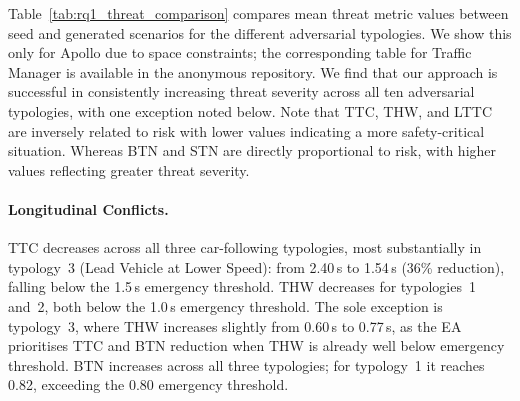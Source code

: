 
Table~\ref{tab:rq1_threat_comparison} compares mean threat metric values between seed and generated scenarios for the different adversarial typologies. We show this only for Apollo due to space constraints; the corresponding table for Traffic Manager is available in the anonymous repository.  We find that our approach is successful in consistently increasing threat severity across all ten adversarial typologies, with one exception noted below. Note that TTC, THW, and LTTC are inversely related to risk with lower values indicating a more safety-critical situation.  Whereas BTN and STN are directly proportional to risk, with higher values reflecting greater threat severity. 

\paragraph{Longitudinal Conflicts.}
TTC decreases across all three car-following typologies, most substantially in typology~3 (Lead Vehicle at Lower Speed): from 2.40\,s to 1.54\,s (36\% reduction), falling below the 1.5\,s emergency threshold. THW decreases for typologies~1 and~2, both below the 1.0\,s emergency threshold. The sole exception is typology~3, where THW increases slightly from 0.60\,s to 0.77\,s, as the EA prioritises TTC and BTN reduction when THW is already well below emergency threshold. BTN increases across all three typologies; for typology~1 it reaches 0.82, exceeding the 0.80 emergency threshold.

